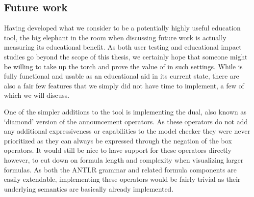 




\subsection{Future work}


Having developed what we consider to be a potentially highly useful education tool, the big elephant in the room when discussing future work is actually measuring its educational benefit. As both user testing and educational impact studies go beyond the scope of this thesis, we certainly hope that someone might be willing to take up the torch and prove the value of \cname in such settings. While \cname is fully functional and usable as an educational aid in its current state, there are also a fair few features that we simply did not have time to implement, a few of which we will discuss.

One of the simpler additions to the tool is implementing the dual, also known as `diamond' version of the announcement operators. As these operators do not add any additional expressiveness or capabilities to the model checker they were never prioritized as they can always be expressed through the negation of the box operators. It would still be nice to have support for these operators directly however, to cut down on formula length and complexity when visualizing larger formulas. As both the ANTLR grammar and related formula components are easily extendable, implementing these operators would be fairly trivial as their underlying semantics are basically already implemented.

